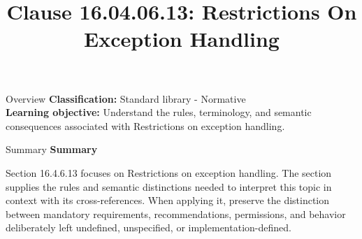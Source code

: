 \documentclass[10pt,letterpaper]{article}
\title{Clause 16.04.06.13: Restrictions On Exception Handling}
\author{}
\date{}
\begin{document}
\maketitle
\begin{CornellOverviewBox}{Overview}
\textbf{Classification:} Standard library - Normative\\[2pt]
\textbf{Learning objective:} Understand the rules, terminology, and semantic consequences associated with Restrictions on exception handling.
\end{CornellOverviewBox}\begin{CornellSummaryBox}{Summary}
{\sffamily\bfseries\color{Accent} Summary}\par\vspace{3pt}Section 16.4.6.13 focuses on Restrictions on exception handling. The section supplies the rules and semantic distinctions needed to interpret this topic in context with its cross-references. When applying it, preserve the distinction between mandatory requirements, recommendations, permissions, and behavior deliberately left undefined, unspecified, or implementation-defined.
\end{CornellSummaryBox}
\end{document}
